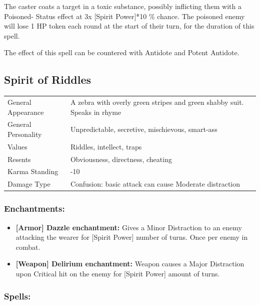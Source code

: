 \documentclass[11pt,a4paper,twocolumn]{book}
\begin{document}
The caster coats a target in a toxic substance, possibly inflicting them with a Poisoned- Status effect at 3x [Spirit Power]*10 \% chance. The poisoned enemy will lose 1 HP token each round at the start of their turn, for the duration of this spell. 

The effect of this spell can be countered with Antidote and Potent Antidote.

\bigskip 	

\vfill

\pagebreak

\subsection*{Spirit of Riddles}
{
	\begin{tabu} to 75mm{| X[l,4] | X[l,8] |}
		\hline
		General Appearance		& A zebra with overly green stripes and green shabby suit. Speaks in rhyme	\\
        General Personality	   	& Unpredictable, secretive, mischievous, smart-ass							\\
        Values     				& Riddles, intellect, traps													\\
        Resents     			& Obviousness, directness, cheating 										\\
        Karma Standing      	& -10																		\\
        Damage Type 			& Confusion: basic attack can cause Moderate distraction	 				\\ \hline
	\end{tabu}
		
}

\medskip
\subsubsection*{Enchantments:}

\begin{itemize}
\item \textbf{ [Armor] Dazzle enchantment:} Gives a Minor Distraction to an enemy attacking the wearer for [Spirit Power] number of turns. Once per enemy in combat.
	\item \textbf{ [Weapon] Delirium enchantment:} Weapon causes a Major Distraction upon Critical hit on the enemy for [Spirit Power] amount of turns.
\end{itemize}
	
\subsubsection*{Spells:}
\end{document}
